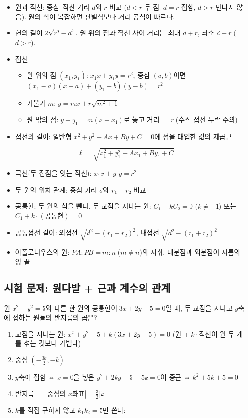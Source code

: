 \begin{itemize}
\tightlist
\item
  원과 직선: 중심--직선 거리 \(d\)와 \(r\) 비교 (\(d<r\) 두 점, \(d=r\)
  접함, \(d>r\) 만나지 않음). 원의 식이 복잡하면 판별식보다 거리 공식이
  빠르다.
\item
  현의 길이 \(2\sqrt{r^2-d^2}\). 원 위의 점과 직선 사이 거리는 최대
  \(d+r\), 최소 \(d-r\) (\(d>r\)).
\item
  접선

  \begin{itemize}
  \tightlist
  \item
    원 위의 점 \((x_1,y_1)\): \(x_1x+y_1y=r^2\), 중심 \((a,b)\)이면
    \((x_1-a)(x-a)+(y_1-b)(y-b)=r^2\)
  \item
    기울기 \(m\): \(y=mx\pm r\sqrt{m^2+1}\)
  \item
    원 밖의 점: \(y-y_1=m(x-x_1)\)로 놓고 거리 \(=r\) (수직 접선 누락
    주의)
  \end{itemize}
\item
  접선의 길이: 일반형 \(x^2+y^2+Ax+By+C=0\)에 점을 대입한 값의 제곱근
\end{itemize}

\[
\ell=\sqrt{x_1^2+y_1^2+Ax_1+By_1+C}
\]

\begin{itemize}
\tightlist
\item
  극선(두 접점을 잇는 직선): \(x_1x+y_1y=r^2\)
\item
  두 원의 위치 관계: 중심 거리 \(d\)와 \(r_1\pm r_2\) 비교
\item
  공통현: 두 원의 식을 뺀다. 두 교점을 지나는 원: \(C_1+kC_2=0\)
  (\(k\ne-1\)) 또는 \(C_1+k\cdot(\text{공통현})=0\)
\item
  공통접선 길이: 외접선 \(\sqrt{d^2-(r_1-r_2)^2}\), 내접선
  \(\sqrt{d^2-(r_1+r_2)^2}\)
\item
  아폴로니우스의 원: \(PA:PB=m:n\) (\(m\ne n\))의 자취. 내분점과
  외분점이 지름의 양 끝
\end{itemize}

\subsection{시험 문제: 원다발 + 근과 계수의 관계}

원 \(x^2+y^2=5\)와 다른 한 원의 공통현이 \(3x+2y-5=0\)일 때, 두 교점을
지나고 \(y\)축에 접하는 원들의 반지름의 곱은?

\begin{enumerate}
\def\labelenumi{\arabic{enumi}.}
\tightlist
\item
  교점을 지나는 원: \(x^2+y^2-5+k(3x+2y-5)=0\) (원 + \(k\cdot\)직선이 원
  두 개를 섞는 것보다 가볍다)
\item
  중심 \(\left(-\tfrac{3k}{2},-k\right)\)
\item
  \(y\)축에 접함 ⇔ \(x=0\)을 넣은 \(y^2+2ky-5-5k=0\)이 중근 ⇔
  \(k^2+5k+5=0\)
\item
  반지름 \(=|\text{중심의 }x\text{좌표}|=\tfrac32|k|\)
\item
  \(k\)를 직접 구하지 않고 \(k_1k_2=5\)만 쓴다:
\end{enumerate}

